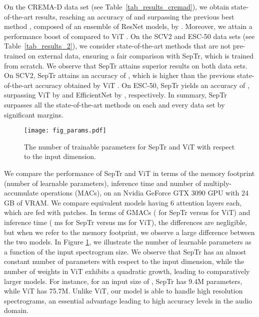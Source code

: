 \documentclass[a4paper]{article}
\begin{document}
On the CREMA-D data set (see Table~\ref{tab_results_cremad}), we obtain state-of-the-art results, reaching an accuracy of  and surpassing the previous best method \cite{Ristea-INTERSPEECH-2021}, composed of an ensemble of ResNet models, by . Moreover, we attain a performance boost of  compared to ViT \cite{Gong-INTERSPEECH-2021}.
On the SCV2 and ESC-50 data sets (see Table~\ref{tab_results_2}), we consider state-of-the-art methods that are not pre-trained on external data, ensuring a fair comparison with SepTr, which is trained from scratch. We observe that SepTr attains superior results on both data sets. On SCV2, SepTr attains an accuracy of , which is  higher than the previous state-of-the-art accuracy obtained by ViT \cite{Gong-INTERSPEECH-2021}. On ESC-50, SepTr yields an accuracy of , surpassing ViT \cite{Gong-INTERSPEECH-2021} by  and EfficientNet \cite{Kim-DCASE-2020} by , respectively. In summary, SepTr surpasses all the state-of-the-art methods on each and every data set by significant margins.

\begin{figure}
\begin{center}
\centerline{\texttt{[image: fig\_params.pdf]}}
\vspace{-0.2cm}
\caption{The number of trainable parameters for SepTr and ViT \cite{Gong-INTERSPEECH-2021} with respect to the input dimension.}
\label{fig_noparams}
\vspace{-1.0cm}
\end{center}
\end{figure}

We compare the performance of SepTr and ViT in terms of the memory footprint (number of learnable parameters), inference time and number of multiply-accumulate operations (MACs), on an Nvidia GeForce GTX 3090 GPU with 24 GB of VRAM. We compare equivalent models having 6 attention layers each, which are fed with  patches. In terms of GMACs ( for SepTr versus  for ViT) and inference time ( ms for SepTr versus  ms for ViT), the differences are negligible, but when we refer to the memory footprint, we observe a large difference between the two models. In Figure \ref{fig_noparams}, we illustrate the number of learnable parameters as a function of the input spectrogram size. We observe that SepTr has an almost constant number of parameters with respect to the input dimension, while the number of weights in ViT exhibits a quadratic growth, leading to comparatively larger models. For instance, for an input size of , SepTr has 9.4M parameters, while ViT has 75.7M. Unlike ViT, our model is able to handle high resolution spectrograms, an essential advantage leading to high accuracy levels in the audio domain.
\end{document}
